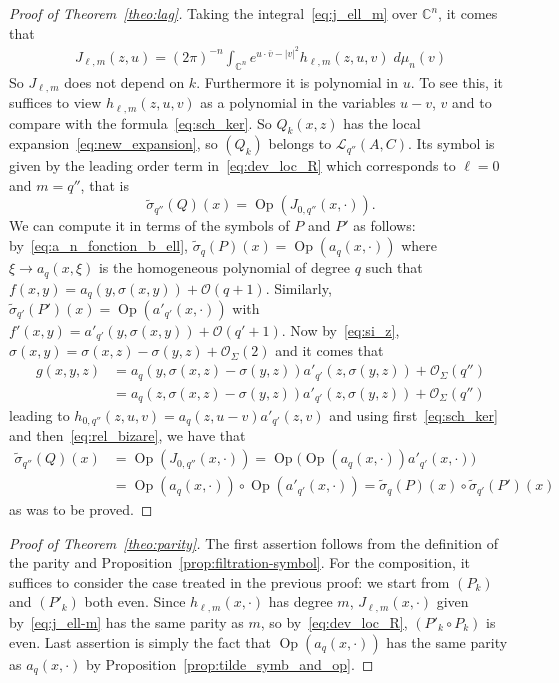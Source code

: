 \documentclass[10pt,a4paper]{article}
\theoremstyle{definition}
\numberwithin{equation}{section}
\newcommand{\C}{{\mathbb{C}}}
\newcommand{\si}{{\sigma}}
\newcommand{\Si}{{\Sigma}}
\newcommand{\con}{\overline}
\newcommand{\op}{\operatorname}
\newcommand{\bigo}{\mathcal{O}}
\newcommand{\lag}{\mathcal{L}}
\begin{document}
\begin{proof}[Proof of Theorem~\ref{theo:lag}]
Taking the integral~\eqref{eq:j_ell_m} over $\C^n$, it comes that
\begin{gather}\label{eq:j_ell-m}
J_{\ell,m} (z,u) = (2 \pi)^{-n} \int_{\C^n} e^{u \cdot \con v - | v| ^2 } h_{\ell, m } (z, u, v) \; d\mu_n (v)
\end{gather}
So $J_{\ell,m}$ does not depend on $k$. Furthermore it is polynomial in $u$. To see this, it suffices to view $h_{\ell, m } (z,u, v)$ as a polynomial in the variables $u-v$, $v$ and to compare with the formula~\eqref{eq:sch_ker}. So $Q_k (x,z)$ has the local expansion~\eqref{eq:new_expansion}, so $(Q_k)$ belongs to $\lag _{q''} (A, C)$. Its symbol is given by the leading order term in~\eqref{eq:dev_loc_R} which corresponds to $\ell =0$ and $m = q''$, that is
\[
\widetilde{\si}_{q''} (Q) (x) = \op{Op} (J_{0, q''} (x,
\cdot)).
\]
We can compute it in terms of the symbols of $P$ and $P'$ as follows: by~\eqref{eq:a_n_fonction_b_ell}, $\widetilde \si_{q} (P)(x) = \op{Op} (a_q(x, \cdot))$ where $\xi \rightarrow a_q(x,\xi)$ is the homogeneous polynomial of degree $q$ such that $f(x,y) = a_q (y, \si (x,y)) + \bigo (q+1)$. Similarly, $\widetilde \si_{q'} (P')(x) = \op{Op} (a'_{q'}(x, \cdot))$ with $f'(x,y) = a'_{q'} (y, \si (x,y)) + \bigo (q'+1)$. Now by~\eqref{eq:si_z}, $\si (x,y) = \si (x,z) - \si (y,z) + \bigo _{\Si} (2)$ and it comes that
\begin{align*}
g(x,y,z) & = a_q (y, \si (x,z) - \si (y,z)) a'_{q'} (z, \si (y,z)) +
\bigo_{\Si} (q'') \\
& = a_q (z, \si (x,z) - \si (y,z)) a'_{q'} (z, \si (y,z)) +
\bigo_{\Si} (q'')
\end{align*}
leading to $ h_{0, q''} (z, u,v) = a_q (z, u - v) a'_{q'} (z,v) $ and using first~\eqref{eq:sch_ker} and then~\eqref{eq:rel_bizare}, we have that
\begin{align*}
\widetilde{\si}_{q''} (Q)(x) & = \op{Op} (J_{0, q''} (x,
\cdot)) = \op{Op} \bigl(\op{Op} (a_q (x,\cdot)) a'_{q'} (x,\cdot) \bigr) \\
& = \op{Op} (a_q (x,\cdot)) \circ \op{Op} (a'_{q'} (x,\cdot)) = \widetilde \si_{q} (P) (x)
\circ \widetilde \si_{q'} (P')(x)
\end{align*}
as was to be proved.
\end{proof}

\begin{proof}[Proof of Theorem~\ref{theo:parity}]
The first assertion follows from the definition of the parity and Proposition~\ref{prop:filtration-symbol}. For the composition, it suffices to consider the case treated in the previous proof: we start from $(P_k)$ and $(P'_k)$ both even. Since $h_{\ell,m}(x,\cdot) $ has degree $m$, $J_{\ell,m}(x, \cdot)$ given by~\eqref{eq:j_ell-m} has the same parity as $m$, so by~\eqref{eq:dev_loc_R}, $(P'_k \circ P_k)$ is even. Last assertion is simply the fact that $\op{Op} (a_q(x,\cdot))$ has the same parity as $a_q (x,\cdot)$ by Proposition~\ref{prop:tilde_symb_and_op}.
\end{proof}
\end{document}

